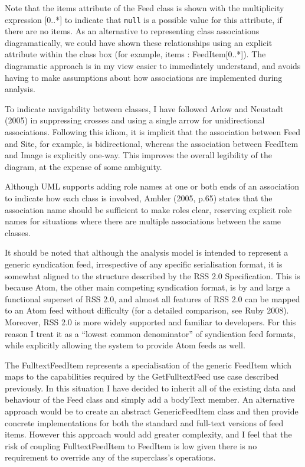 \documentclass[a4paper]{article}
\begin{document}
Note that the \textsf{items} attribute of the \textsf{Feed} class is shown with the multiplicity expression \textsf{[0..*]} to indicate that \texttt{null} is a possible value for this attribute, if there are no items. As an alternative to representing class associations diagramatically, we could have shown these relationships using an explicit attribute within the class box (for example, \textsf{items : FeedItem[0..*]}). The diagramatic approach is in my view easier to immediately understand, and avoids having to make assumptions about how associations are implemented during analysis.

To indicate navigability between classes, I have followed Arlow and Neustadt (2005) in suppressing crosses and using a single arrow for unidirectional associations. Following this idiom, it is implicit that the association between \textsf{Feed} and \textsf{Site}, for example, is bidirectional, whereas the association between \textsf{FeedItem} and \textsf{Image} is explicitly one-way. This improves the overall legibility of the diagram, at the expense of some ambiguity.

Although UML supports adding role names at one or both ends of an association to indicate how each class is involved, Ambler (2005, p.65) states that the association name should be sufficient to make roles clear, reserving explicit role names for situations where there are multiple associations between the same classes.

It should be noted that although the analysis model is intended to represent a generic syndication feed, irrespective of any specific serialisation format, it is somewhat aligned to the structure described by the RSS 2.0 Specification\cite{rss}. This is because Atom, the other main competing syndication format, is by and large a functional superset of RSS 2.0, and almost all features of RSS 2.0 can be mapped to an Atom feed without difficulty (for a detailed comparison, see Ruby 2008). Moreover, RSS 2.0 is more widely supported and familiar to developers. For this reason I treat it as a ``lowest common denominator'' of syndication feed formats, while explicitly allowing the system to provide Atom feeds as well.

The \textsf{FulltextFeedItem} represents a specialisation of the generic \textsf{FeedItem} which maps to the capabilities required by the \textsf{GetFulltextFeed} use case described previously. In this situation I have decided to inherit all of the existing data and behaviour of the \textsf{Feed} class and simply add a \textsf{bodyText} member. An alternative approach would be to create an abstract \textsf{GenericFeedItem} class and then provide concrete implementations for both the standard and full-text versions of feed items. However this approach would add greater complexity, and I feel that the risk of coupling \textsf{FulltextFeedItem} to \textsf{FeedItem} is low given there is no requirement to override any of the superclass's operations.
\end{document}
